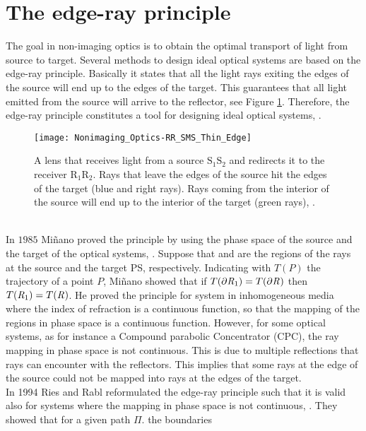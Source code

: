 \section{The edge-ray principle}
The goal in non-imaging optics is to obtain the optimal transport of light from source to target. 
Several methods to design ideal optical systems are based on the edge-ray principle. 
Basically it states that all the light  rays exiting the edges of the source will end up to the edges of the target. 
This guarantees that all light emitted from the source will arrive to the reflector, see Figure \ref{fig:edge}. 
Therefore, the edge-ray principle constitutes a tool for designing ideal optical systems, \cite{welford1978problem, minano1992new}.
 \begin{figure}[h]
  \begin{center}
  \texttt{[image: Nonimaging\_Optics-RR\_SMS\_Thin\_Edge]}
  \end{center}
  \caption{A lens that receives light from a source $\textrm{S}_1\textrm{S}_2$ and redirects it to the receiver $\textrm{R}_1\textrm{R}_2$. 
Rays that leave the edges of the source hit the edges of the target (blue and right rays). Rays coming from the interior of the source will end up to the interior of the target (green rays), \cite{wiki2}.}
  \label{fig:edge}
\end{figure}
\\ \indent
In $1985$ Mi{\~n}ano proved the principle by using the phase space of the source and the target of the optical systems, \cite{minano1986design}. 
Suppose that  and  are the regions of the rays at the source and the target PS, respectively. 
Indicating with $T(P)$ the trajectory of a point $P$, Mi{\~n}ano showed that if $T(\partial\mbox{$\emph{R}_{\textit{$1$}}$})=T(\partial\mbox{$\emph{R}_{\textit{}}$})$ then $T(\mbox{$\emph{R}_{\textit{$1$}}$})=T(\mbox{$\emph{R}_{\textit{}}$})$. He proved the principle for system in inhomogeneous media where the index of refraction is a continuous function, so that the mapping of the regions in phase space is a continuous function. However, for some optical systems, as for instance a Compound parabolic Concentrator (CPC), the ray mapping in phase space is not continuous. This is due to multiple reflections that rays can encounter with the reflectors. 
This implies that some rays at the edge of the source could not be mapped into rays at the edges of the target. \\ \indent 
In 1994 Ries and Rabl reformulated the edge-ray principle such that it is valid also for systems where the mapping in phase space is not continuous, \cite{Ries:2}. They showed that for a given path $\Pi$. the boundaries
